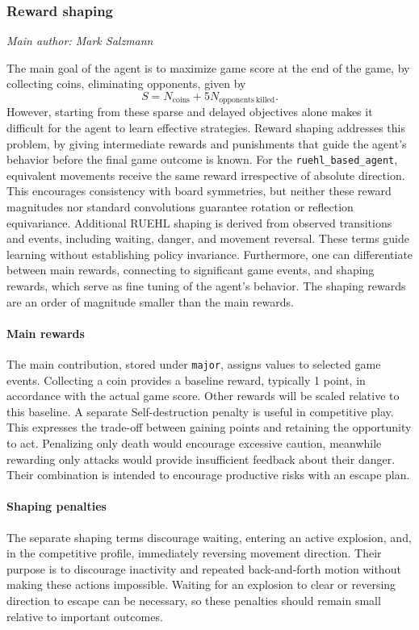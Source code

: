 \documentclass[11pt,a4paper]{article}
\newcommand{\contributionauthor}[1]{{\small\textit{Main author: #1}\par}}
\begin{document}
\subsubsection{Reward shaping}
\contributionauthor{Mark Salzmann}
\label{sec:reward-design}
The main goal of the agent is to maximize game score at the end of the game, by collecting coins, eliminating opponents, given by
\begin{equation}
S=N_{\mathrm{coins}}+5N_{\mathrm{opponents\ killed}}.
\end{equation}
However, starting from these sparse and delayed objectives alone makes it difficult for the agent to learn effective strategies.
Reward shaping addresses this problem, by giving intermediate rewards and punishments that guide the agent's behavior before the final game outcome is known.
For the \texttt{ruehl\_based\_agent}, equivalent movements receive the same reward irrespective of absolute direction. This encourages consistency with board symmetries, but neither these reward magnitudes nor standard convolutions guarantee rotation or reflection equivariance.
Additional RUEHL shaping is derived from observed transitions and events, including waiting, danger, and movement reversal. These terms guide learning without establishing policy invariance.
Furthermore, one can differentiate between main rewards, connecting to significant game events, and shaping rewards, which serve as fine tuning of the agent's behavior. The shaping rewards are an order of magnitude smaller than the main rewards.

\paragraph{Main rewards}
The main contribution, stored under \texttt{major},
assigns values to selected game events.
Collecting a coin provides a baseline reward, typically 1 point, in accordance with the actual game score.
Other rewards will be scaled relative to this baseline.
A separate Self-destruction penalty is useful in competitive play. 
This expresses the trade-off between gaining points and retaining the opportunity to act. 
Penalizing only death would encourage excessive caution, meanwhile rewarding only attacks would provide insufficient feedback about their danger. 
Their combination is intended to encourage productive risks with an escape plan.

\paragraph{Shaping penalties}
The separate shaping terms discourage waiting, entering an active explosion,
and, in the competitive profile, immediately reversing movement direction.
Their purpose is to discourage inactivity and repeated back-and-forth motion
without making these actions impossible. Waiting for an explosion to clear
or reversing direction to escape can be necessary, so these penalties should
remain small relative to important outcomes.
\end{document}
